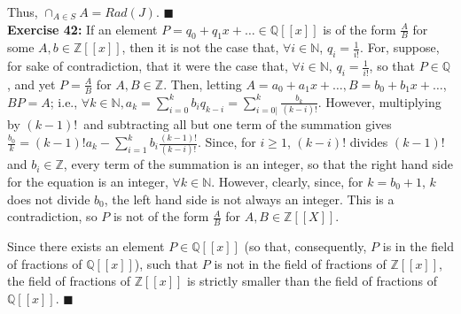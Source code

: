 \documentclass{article}%
\begin{document}
Thus, $\cap_{A \in S} A = Rad(J)$. \qquad $\blacksquare$ \\

\textbf{Exercise 42:} If an element $P = q_0 + q_1x + \ldots \in
\mathbb{Q}[[x]]$ is of the form $\frac{A}{B}$ for some $A, b \in
\mathbb{Z}[[x]]$, then it is not the case that, $\forall i \in \mathbb{N}$,
$q_i = \frac{1}{i!}$. For, suppose, for sake of contradiction, that it were
the case that, $\forall i \in \mathbb{N}$, $q_i = \frac{1}{i!}$, so that
$P \in \mathbb{Q}$, and yet $P = \frac{A}{B}$ for $A,B \in \mathbb{Z}$. Then,
letting $A = a_0 + a_1x + \ldots, B = b_0 + b_1x + \ldots$, $BP = A$;
i.e., $\forall k \in \mathbb{N}, a_k = \sum_{i = 0}^k b_iq_{k - i}
 = \sum_{i = 0|}^k \frac{b_k}{(k - i)!}$. However, multiplying by $(k - 1)!$\
and subtracting all but one term of the summation gives $\frac{b_0}{k}
= (k - 1)!a_k - \sum_{i = 1}^k b_i\frac{(k - 1)!}{(k - i)!}$. Since, for
$i \geq 1$, $(k - i)!$ divides $(k - 1)!$ and $b_i \in \mathbb{Z}$, every term
of the summation is an integer, so that the right hand side for the equation
is an integer, $\forall k \in \mathbb{N}$. However, clearly, since, for
$k = b_0 + 1$, $k$ does not divide $b_0$, the left hand side is not always an
integer. This is a contradiction, so $P$ is not of the form $\frac{A}{B}$ for
$A, B \in \mathbb{Z}[[X]]$.

Since there exists an element $P \in \mathbb{Q}[[x]]$ (so that, consequently,
$P$ is in the field of fractions of $\mathbb{Q}[[x]]$), such that $P$ is not
in the field of fractions of $\mathbb{Z}[[x]]$, the field of fractions of
$\mathbb{Z}[[x]]$ is strictly smaller than the field of fractions of
$\mathbb{Q}[[x]]$. \qquad $\blacksquare$
\end{document}

